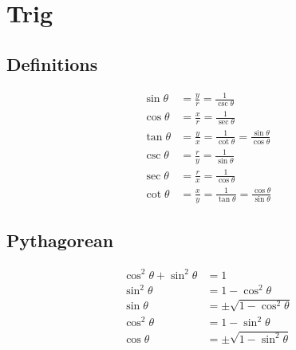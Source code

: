 \documentclass{report}
\def\true{1} %
\def\false{0} %
\theoremstyle{mytheoremstyle}
\theoremstyle{mytheoremstyle}
\theoremstyle{myproblemstyle}
\begin{document}

    \section{Trig}
    \subsection{Definitions}
    \begin{align}
        \sin\theta &= \frac{y}{r} = \frac{1}{\csc\theta} \\
        \cos\theta &= \frac{x}{r} = \frac{1}{\sec\theta} \\
        \tan\theta &= \frac{y}{x} = \frac{1}{\cot\theta} = \frac{\sin\theta}{\cos\theta} \\
        \csc\theta &= \frac{r}{y} = \frac{1}{\sin\theta} \\
        \sec\theta &= \frac{r}{x} = \frac{1}{\cos\theta} \\
        \cot\theta &= \frac{x}{y} = \frac{1}{\tan\theta} = \frac{\cos\theta}{\sin\theta}
    \end{align}
    \subsection{Pythagorean}
    \begin{align}
        \cos^2\theta+\sin^2\theta &= 1 \\
        \sin^2\theta &= 1 - \cos^2 \theta \\
        \sin\theta &= \pm\sqrt{1 - \cos^2 \theta} \\
        \cos^2\theta &= 1 - \sin^2 \theta \\
        \cos\theta &= \pm\sqrt{1 - \sin^2 \theta} \\
    \end{align}
\end{document}
